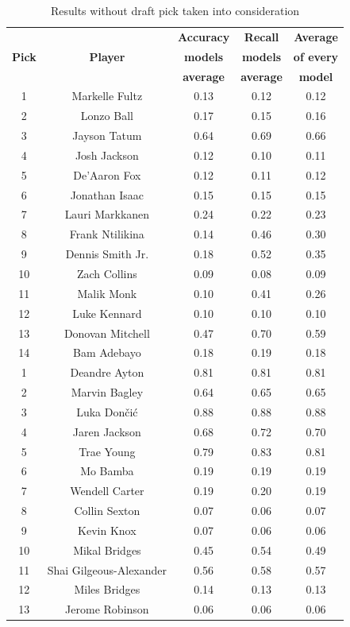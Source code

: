 \documentclass[a4paper]{article}
\begin{document}
\begin{table}[!h] %
\begin{center}
\begin{tabular}{|c|c|c|c|c|} \hline
\textbf{ } & \textbf{ } & \textbf{Accuracy} & \textbf{Recall} & \textbf{Average} \\
\textbf{Pick} & \textbf{Player} & \textbf{models} & \textbf{models} & \textbf{of every} \\
\textbf{ } & \textbf{ } & \textbf{average} & \textbf{average} & \textbf{model} \\ \hline
1 & Markelle Fultz & 0.13 & 0.12 & 0.12 \\ \hline
2 & Lonzo Ball & 0.17 & 0.15 & 0.16 \\ \hline
3 & Jayson Tatum & 0.64 & 0.69 & 0.66 \\ \hline
4 & Josh Jackson & 0.12 & 0.10 & 0.11 \\ \hline
5 & De'Aaron Fox & 0.12 & 0.11 & 0.12 \\ \hline
6 & Jonathan Isaac & 0.15 & 0.15 & 0.15 \\ \hline
7 & Lauri Markkanen & 0.24 & 0.22 & 0.23 \\ \hline
8 & Frank Ntilikina & 0.14 & 0.46 & 0.30 \\ \hline
9 & Dennis Smith Jr. & 0.18 & 0.52 & 0.35 \\ \hline
10 & Zach Collins & 0.09 & 0.08 & 0.09 \\ \hline
11 & Malik Monk & 0.10 & 0.41 & 0.26 \\ \hline
12 & Luke Kennard & 0.10 & 0.10 & 0.10 \\ \hline
13 & Donovan Mitchell & 0.47 & 0.70 & 0.59 \\ \hline
14 & Bam Adebayo & 0.18 & 0.19 & 0.18 \\ \hline
1 & Deandre Ayton & 0.81 & 0.81 & 0.81 \\ \hline
2 & Marvin Bagley & 0.64 & 0.65 & 0.65 \\ \hline
3 & Luka Dončić & 0.88 & 0.88 & 0.88 \\ \hline
4 & Jaren Jackson & 0.68 & 0.72 & 0.70 \\ \hline
5 & Trae Young & 0.79 & 0.83 & 0.81 \\ \hline
6 & Mo Bamba & 0.19 & 0.19 & 0.19 \\ \hline
7 & Wendell Carter & 0.19 & 0.20 & 0.19 \\ \hline
8 & Collin Sexton & 0.07 & 0.06 & 0.07 \\ \hline
9 & Kevin Knox & 0.07 & 0.06 & 0.06 \\ \hline
10 & Mikal Bridges & 0.45 & 0.54 & 0.49 \\ \hline
11 & Shai Gilgeous-Alexander & 0.56 & 0.58 & 0.57 \\ \hline
12 & Miles Bridges & 0.14 & 0.13 & 0.13 \\ \hline
13 & Jerome Robinson & 0.06 & 0.06 & 0.06 \\ \hline
\end{tabular}
\caption{Results without draft pick taken into consideration}
\label{tab:results_no_draft_pick_all_star}
\end{center}
\end{table}
\end{document}
